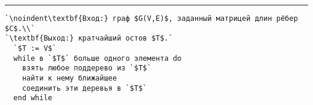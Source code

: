 \vspace{5pt} \hrule

\begin{lstlisting}[caption={Построение кратчайшего остова}, label=p328, escapechar=`]
`\noindent\textbf{Вход:} граф $G(V,E)$, заданный матрицей длин рёбер $C$.\\`
`\textbf{Выход:} кратчайший остов $T$.`
  `$T := V$`
  while в `$T$` больше одного элемента do
    взять любое поддерево из `$T$`
    найти к нему ближайшее
    соединить эти деревья в `$T$`
  end while

\end{lstlisting}
